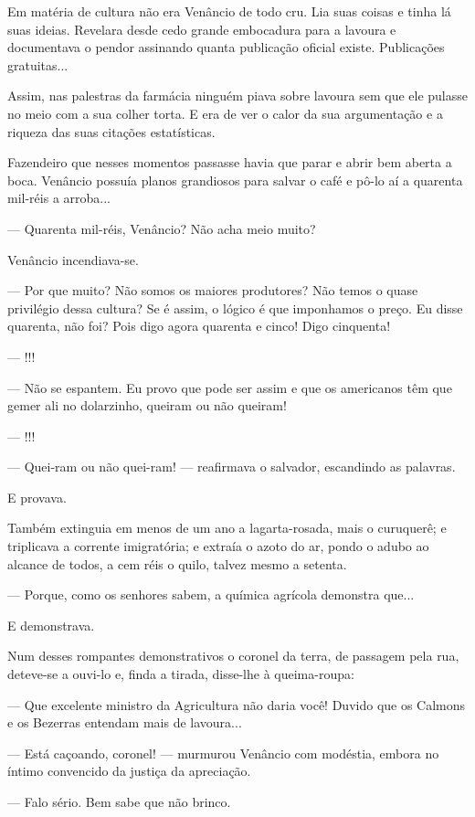 Em matéria de cultura não era Venâncio de todo cru. Lia suas coisas e
tinha lá suas ideias. Revelara desde cedo grande embocadura para a
lavoura e documentava o pendor assinando quanta publicação oficial
existe. Publicações gratuitas...

Assim, nas palestras da farmácia ninguém piava sobre lavoura sem que ele
pulasse no meio com a sua colher torta. E era de ver o calor da sua
argumentação e a riqueza das suas citações estatísticas.

Fazendeiro que nesses momentos passasse havia que parar e abrir bem
aberta a boca. Venâncio possuía planos grandiosos para salvar o café e
pô-lo aí a quarenta mil-réis a arroba...

--- Quarenta mil-réis, Venâncio? Não acha meio muito?

Venâncio incendiava-se.

--- Por que muito? Não somos os maiores produtores? Não temos o quase
privilégio dessa cultura? Se é assim, o lógico é que imponhamos o preço.
Eu disse quarenta, não foi? Pois digo agora quarenta e cinco! Digo
cinquenta!

--- !!!

--- Não se espantem. Eu provo que pode ser assim e que os americanos têm
que gemer ali no dolarzinho, queiram ou não queiram!

--- !!!

--- Quei-ram ou não quei-ram! --- reafirmava o salvador, escandindo as
palavras.

E provava.

Também extinguia em menos de um ano a lagarta-rosada, mais o curuquerê;
e triplicava a corrente imigratória; e extraía o azoto do ar, pondo o
adubo ao alcance de todos, a cem réis o quilo, talvez mesmo a setenta.

--- Porque, como os senhores sabem, a química agrícola demonstra que...

E demonstrava.

Num desses rompantes demonstrativos o coronel da terra, de passagem pela
rua, deteve-se a ouvi-lo e, finda a tirada, disse-lhe à queima-roupa:

--- Que excelente ministro da Agricultura não daria você! Duvido que os
Calmons e os Bezerras entendam mais de lavoura...

--- Está caçoando, coronel! --- murmurou Venâncio com modéstia, embora
no íntimo convencido da justiça da apreciação.

--- Falo sério. Bem sabe que não brinco.

